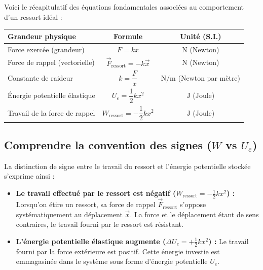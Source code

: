 \documentclass[11pt,openany]{book}
\begin{document}
Voici le récapitulatif des équations fondamentales associées au comportement d'un ressort idéal :

\vspace{0.3cm}

\begin{center}
\renewcommand{\arraystretch}{1.5}
\begin{tabular}{|l|c|c|}
\hline
\textbf{Grandeur physique} & \textbf{Formule} & \textbf{Unité (S.I.)} \\ \hline
Force exercée (grandeur) & $F = kx$ & $\text{N}$ (Newton) \\ \hline
Force de rappel (vectorielle) & $\vec{F}_{\text{ressort}} = -k\vec{x}$ & $\text{N}$ (Newton) \\ \hline
Constante de raideur & $k = \dfrac{F}{x}$ & $\text{N/m}$ (Newton par mètre) \\ \hline
Énergie potentielle élastique & $U_e = \dfrac{1}{2} k x^2$ & $\text{J}$ (Joule) \\ \hline
Travail de la force de rappel & $W_{\text{ressort}} = -\dfrac{1}{2} k x^2$ & $\text{J}$ (Joule) \\ \hline
\end{tabular}
\end{center}

\vspace{0.4cm}

\subsection*{Comprendre la convention des signes ($W$ vs $U_e$)}

La distinction de signe entre le travail du ressort et l'énergie potentielle stockée s'exprime ainsi :

\begin{itemize}
    \item \textbf{Le travail effectué par le ressort est négatif ($W_{\text{ressort}} = -\frac{1}{2}kx^2$) :} 
    Lorsqu'on étire un ressort, sa force de rappel $\vec{F}_{\text{ressort}}$ s'oppose systématiquement au déplacement $\vec{x}$. La force et le déplacement étant de sens contraires, le travail fourni par le ressort est résistant.

    \item \textbf{L'énergie potentielle élastique augmente ($\Delta U_e = +\frac{1}{2}kx^2$) :} 
    Le travail fourni par la force extérieure est positif. Cette énergie investie est emmagasinée dans le système sous forme d'énergie potentielle $U_e$.
\end{itemize}
\end{document}
